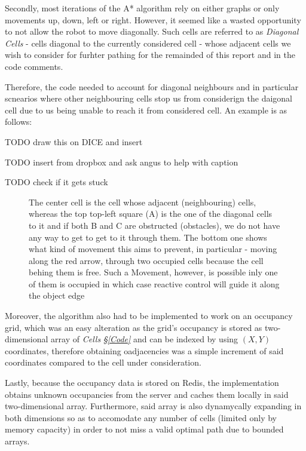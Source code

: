 \documentclass[11pt, a4paper]{article}
\begin{document}
Secondly, most iterations of the A* algorithm rely on either graphs\cite{path_astar_grid_no_grid}  or only movements up, down, left or right\cite{path_astar_grid_no_diagonals}. However, it seemed like a wasted opportunity to not allow the robot to move diagonally. Such cells are referred to as  \textit{Diagonal Cells} - cells diagonal to the currently considered cell - whose adjacent cells we wish to consider for furhter pathing for the remainded of this report and in the code comments. 

Therefore, the code needed to account for diagonal neighbours and in particular scnearios where other neighbouring cells stop us from considerign the daigonal cell due to us being unable to reach it from considered cell. An example is as follows:

TODO draw this on DICE and insert

TODO insert from dropbox and ask angus to help with caption


TODO check if it gets stuck

\begin{figure}
	  \caption{The center cell is the cell whose adjacent (neighbouring) cells, whereas the top top-left square (A) is the one of the diagonal 
			cells to it and if both B and C are obstructed (obstacles), we do not have any way to get to get to it through them. The bottom one shows what kind of movement this aims to prevent, in particular - moving along the red arrow, through two occupied cells because the cell behing them is free. Such a Movement, however, is possible inly one of them is occupied in which case reactive control will guide it along the object edge}
\end{figure} 

Moreover, the algorithm also had to be implemented to work on an occupancy grid, which was an easy alteration as the grid's occupancy is stored as two-dimensional array of \textit{Cells} \textit{\S\ref{Code}} and can be indexed by using $(X ,Y)$ coordinates, therefore obtaining oadjacencies was a simple increment of said coordinates compared to the cell under consideration.

Lastly, because the occupancy data is stored on Redis, the implementation obtains unknown occupancies from the server and caches them locally in said two-dimensional array. Furthermore, said array is also dynamycally expanding in both dimensions so as to accomodate any number of cells (limited only by memory capacity) in order to not miss a valid optimal path due to bounded arrays. 
\end{document}
